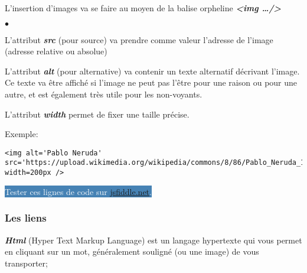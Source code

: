 \documentclass[10pt,dvipsnames, dvips, svgnames]{article}
\newlength\taille
\begin{document}
L'insertion d'images  va se faire au moyen de la balise orpheline \textbf{\textit{<img  \dots />}} 

\begin{list}{$\bullet$}{}
\item L'attribut \textbf{\textit{src}} (pour source) va prendre comme valeur l'adresse de l'image (adresse relative ou absolue)
\item L'attribut \textbf{\textit{alt}} (pour alternative) va contenir un texte alternatif décrivant l'image. Ce texte va être affiché si l'image ne peut pas l'être pour une raison ou pour une autre, et est également très utile pour les non-voyants.
\item L'attribut \textbf{\textit{width}}  permet de fixer une taille précise.%
\end{list}

Exemple:

\begin{lstlisting}
<img alt='Pablo Neruda' src='https://upload.wikimedia.org/wikipedia/commons/8/86/Pablo_Neruda_1963.jpg' width=200px />
\end{lstlisting}



\hypersetup{urlcolor=white}
\colorbox{SteelBlue}{\textcolor{white}{Tester ces lignes de code sur \href{https://jsfiddle.net/}{jsfiddle.net}.}}
\hypersetup{urlcolor=blue}


\subsubsection{Les liens}

\textbf{\textit{Html}} (Hyper Text Markup Language) est un langage hypertexte  qui vous permet en cliquant sur un mot, généralement souligné (ou une image) de vous transporter;


\end{document}
